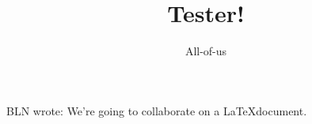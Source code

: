 \documentclass[12pt]{article}
\title{Tester!}
\author{All-of-us}
\newcommand{\bln}[1]{BLN wrote: \textcolor{red!70!blue!70}{#1}}
\begin{document}
\maketitle

\bln{We're going to collaborate on a \LaTeX document.}
\end{document}
